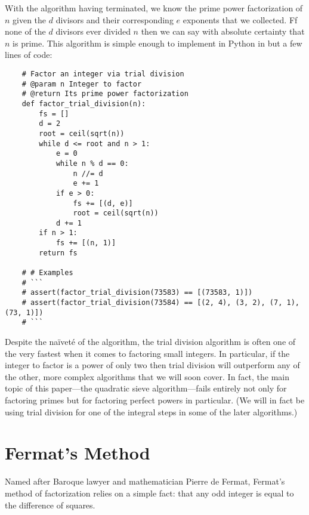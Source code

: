 \documentclass{report}
\begin{document}
With the algorithm having terminated, we know the prime power factorization of $n$ given the $d$
divisors and their corresponding $e$ exponents that we collected. Ff none of the $d$ divisors ever
divided $n$ then we can say with absolute certainty that $n$ is prime. This algorithm is simple
enough to implement in Python in but a few lines of code:
\begin{verbatim}
    # Factor an integer via trial division
    # @param n Integer to factor
    # @return Its prime power factorization
    def factor_trial_division(n):
        fs = []
        d = 2
        root = ceil(sqrt(n))
        while d <= root and n > 1:
            e = 0
            while n % d == 0:
                n //= d
                e += 1
            if e > 0:
                fs += [(d, e)]
                root = ceil(sqrt(n))
            d += 1
        if n > 1:
            fs += [(n, 1)]
        return fs

    # # Examples
    # ```
    # assert(factor_trial_division(73583) == [(73583, 1)])
    # assert(factor_trial_division(73584) == [(2, 4), (3, 2), (7, 1), (73, 1)])
    # ```
\end{verbatim}
Despite the naïveté of the algorithm, the trial division algorithm is often one of the very fastest
when it comes to factoring small integers. In particular, if the integer to factor is a power of
only two then trial division will outperform any of the other, more complex algorithms that we will
soon cover. In fact, the main topic of this paper---the quadratic sieve algorithm---fails entirely
not only for factoring primes but for factoring perfect powers in particular. (We will in fact be
using trial division for one of the integral steps in some of the later algorithms.)

\section{Fermat's Method}
Named after Baroque lawyer and mathematician Pierre de Fermat, Fermat's method of factorization
relies on a simple fact: that any odd integer is equal to the difference of squares.
\end{document}
